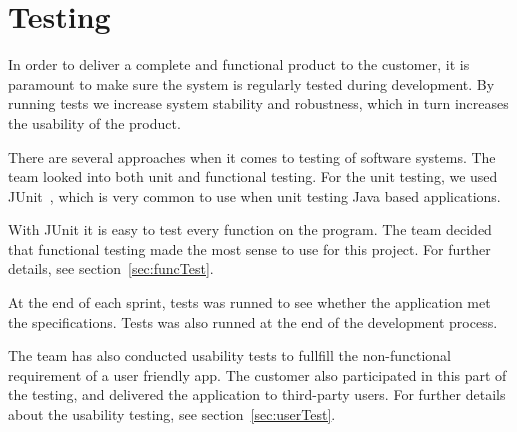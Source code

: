 \chapter{Testing}

In order to deliver a complete and functional product to the customer, it is paramount to make sure the system is regularly tested during development. 
By running tests we increase system stability and robustness, which in turn increases the usability of the product. 

There are several approaches when it comes to testing of software systems. The team looked into both \gls{unit} and functional testing. For the unit testing, we used JUnit~\cite{junit}, which is very common to use when unit testing Java based applications.

With JUnit it is easy to test every function on the program. The team decided that functional testing made the most sense to use for this project. For further details, see section~\ref{sec:funcTest}.


At the end of each sprint, tests was runned to see whether the application met the specifications. Tests was also runned at the end of the development process. 

The team has also conducted usability tests to fullfill the non-functional requirement of a user friendly app. The customer also participated in this part of the testing, and delivered the application to third-party users. For further details about the usability testing, see section~\ref{sec:userTest}.
\newpage


